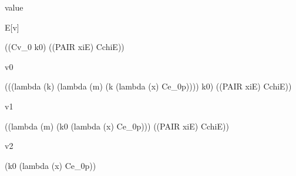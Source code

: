 \documentclass[ms,electronic,twosidetoc,letterpaper,chaptercenter,parttop]{byumsphd}
\begin{document}
\begin{singlespace}
value
\begin{schemedisplay}
E[v]
\end{schemedisplay}

\begin{schemedisplay}
((Cv_0 k0) ((PAIR xiE) CchiE))
\end{schemedisplay}

v0
\begin{schemedisplay}
(((lambda (k) (lambda (m) (k (lambda (x) Ce_0p)))) k0) ((PAIR xiE) CchiE))
\end{schemedisplay}

v1
\begin{schemedisplay}
((lambda (m) (k0 (lambda (x) Ce_0p))) ((PAIR xiE) CchiE))
\end{schemedisplay}

v2
\begin{schemedisplay}
(k0 (lambda (x) Ce_0p))
\end{schemedisplay}
\end{singlespace}



\end{document}
